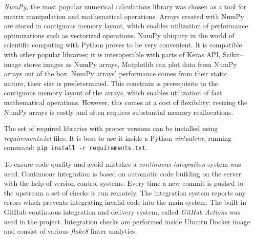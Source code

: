 \textit{NumPy}, the most popular numerical calculations library was chosen as a tool for matrix manipulation and mathematical operations.
Arrays created with NumPy are stored in contiguous memory layout, which enables utilization of performance optimizations such as vectorized operations. 
NumPy ubiquity in the world of scientific computing with Python proves to be very convenient.
It is compatible with other popular libraries; it is interoperable with parts of Keras API, Scikit--image stores images as NumPy arrays, Matplotlib can plot data from NumPy arrays out of the box.
NumPy arrays' performance comes from their static nature, their size is predetermined.
This constrain is prerequisite to the contiguous memory layout of the arrays, which enables utilization of fast mathematical operations.
However, this comes at a cost of flexibility; resizing the NumPy arrays is costly and often requires substantial memory reallocations.

The set of required libraries with proper versions can be installed using \textit{requirements.txt} files.
It is best to use it inside a Python \textit{virtualenv}, running command: \texttt{pip install -r requirements.txt}.

To ensure code quality and avoid mistakes a \textit{continuous integration} system was used.
Continuous integration is based on automatic code building on the server with the help of version control systems.
Every time a new commit is pushed to the upstream a set of checks is run remotely.
The integration system reports any errors which prevents integrating invalid code into the main system.
The built in GitHub continuous integration and delivery system, called \textit{GitHub Actions} was used in the project.
Integration checks are performed inside Ubuntu Docker image and consist of various \textit{flake8} linter analytics.

